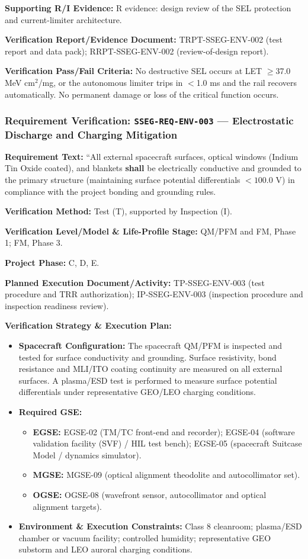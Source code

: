 \par\textbf{Supporting R/I Evidence:} R evidence: design review of the SEL protection and current-limiter architecture.
\par\textbf{Verification Report/Evidence Document:} TRPT-SSEG-ENV-002 (test report and data pack); RRPT-SSEG-ENV-002 (review-of-design report).
\par\textbf{Verification Pass/Fail Criteria:} No destructive SEL occurs at LET $\ge$37.0 MeV cm$^2$/mg, or the autonomous limiter trips in $<$1.0 ms and the rail recovers automatically. No permanent damage or loss of the critical function occurs.
\par\medskip
\subsubsection{Requirement Verification: \texttt{SSEG-REQ-ENV-003} --- Electrostatic Discharge and Charging Mitigation}
\label{ver:SSEG-REQ-ENV-003}
\textbf{Requirement Text:} ``All external spacecraft surfaces, optical windows (Indium Tin Oxide coated), and  blankets \textbf{shall} be electrically conductive and grounded to the primary structure (maintaining surface potential differentials $< 100.0\text{ V}$) in compliance with the project bonding and grounding rules.
\par\textbf{Verification Method:} Test (T), supported by Inspection (I).
\par\textbf{Verification Level/Model \& Life-Profile Stage:} QM/PFM and FM, Phase 1; FM, Phase 3.
\par\textbf{Project Phase:} C, D, E.
\par\textbf{Planned Execution Document/Activity:} TP-SSEG-ENV-003 (test procedure and TRR authorization); IP-SSEG-ENV-003 (inspection procedure and inspection readiness review).
\par\textbf{Verification Strategy \& Execution Plan:}
\begin{itemize}
\item \textbf{Spacecraft Configuration:} The spacecraft QM/PFM is inspected and tested for surface conductivity and grounding. Surface resistivity, bond resistance and MLI/ITO coating continuity are measured on all external surfaces. A plasma/ESD test is performed to measure surface potential differentials under representative GEO/LEO charging conditions.
\item \textbf{Required GSE:}
\begin{itemize}
\item \textbf{EGSE:} EGSE-02 (TM/TC front-end and recorder); EGSE-04 (software validation facility (SVF) / HIL test bench); EGSE-05 (spacecraft Suitcase Model / dynamics simulator).
\item \textbf{MGSE:} MGSE-09 (optical alignment theodolite and autocollimator set).
\item \textbf{OGSE:} OGSE-08 (wavefront sensor, autocollimator and optical alignment targets).
\end{itemize}
\item \textbf{Environment \& Execution Constraints:} Class 8 cleanroom; plasma/ESD chamber or vacuum facility; controlled humidity; representative GEO substorm and LEO auroral charging conditions.
\end{itemize}
